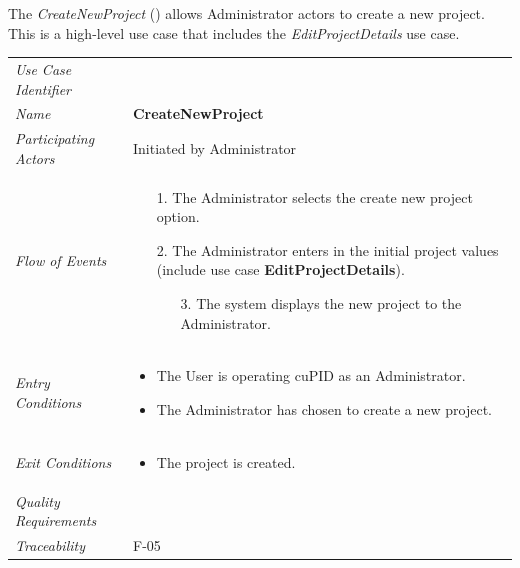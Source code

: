 \documentclass[12pt,letterpaper]{article}
\begin{document}
\newpage{}

The {\it CreateNewProject} () allows Administrator actors to create a new project. This is a high-level use case that includes the {\it EditProjectDetails} use case.

\begin{center}
	\begin{tabu} to 
		\toprule
		Use Case Identifier &  \\
		Name & {\bf CreateNewProject} \\
		Participating Actors & Initiated by Administrator \\
		Flow of Events & 
		\begin{minipage}[t]{\linewidth}
		    \begin{enumerate}
			    \item[1.] The Administrator selects the create new project option.
			    \item[2.] The Administrator enters in the initial project values (include use case \textbf{EditProjectDetails}).
			    \begin{enumerate}
				    \item[3.] The system displays the new project to the Administrator.
				\end{enumerate}
		    \end{enumerate}
	    \end{minipage} \\

		Entry Conditions &
		\begin{minipage}[t]{\linewidth}
			\begin{itemize}
			    \item The User is operating cuPID as an Administrator.
			    \item The Administrator has chosen to create a new project.
	        \end{itemize}
	    \end{minipage} \\

		Exit Conditions & 
		\begin{minipage}[t]{\linewidth}
			\begin{itemize}
			    \item The project is created.
	        \end{itemize}
	    \end{minipage}\\

		Quality Requirements & \\

		Traceability & F-05 \\
		\toprule
	\end{tabu}
\end{center}
\end{document}
